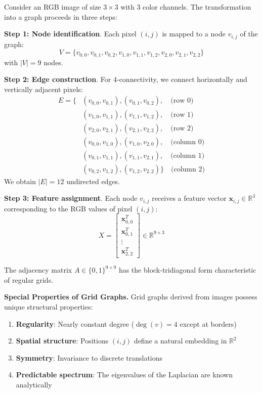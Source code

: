 \begin{example}\label{ex:imagen_3x3_grafo}
Consider an RGB image of size $3 \times 3$ with 3 color channels. The transformation into a graph proceeds in three steps:

\textbf{Step 1: Node identification}. Each pixel $(i,j)$ is mapped to a node $v_{i,j}$ of the graph:
\[
V = \{v_{0,0}, v_{0,1}, v_{0,2}, v_{1,0}, v_{1,1}, v_{1,2}, v_{2,0}, v_{2,1}, v_{2,2}\}
\]
with $|V| = 9$ nodes.

\textbf{Step 2: Edge construction}. For 4-connectivity, we connect horizontally and vertically adjacent pixels:
\begin{align}
E = \{&(v_{0,0}, v_{0,1}), (v_{0,1}, v_{0,2}), \quad \text{(row 0)} \\
    &(v_{1,0}, v_{1,1}), (v_{1,1}, v_{1,2}), \quad \text{(row 1)} \\
    &(v_{2,0}, v_{2,1}), (v_{2,1}, v_{2,2}), \quad \text{(row 2)} \\
    &(v_{0,0}, v_{1,0}), (v_{1,0}, v_{2,0}), \quad \text{(column 0)} \\
    &(v_{0,1}, v_{1,1}), (v_{1,1}, v_{2,1}), \quad \text{(column 1)} \\
    &(v_{0,2}, v_{1,2}), (v_{1,2}, v_{2,2}) \} \quad \text{(column 2)}
\end{align}
We obtain $|E| = 12$ undirected edges.

\textbf{Step 3: Feature assignment}. Each node $v_{i,j}$ receives a feature vector $\mathbf{x}_{i,j} \in \mathbb{R}^3$ corresponding to the RGB values of pixel $(i,j)$:
\[
X = \begin{bmatrix} \mathbf{x}_{0,0}^T \\ \mathbf{x}_{0,1}^T \\ \vdots \\ \mathbf{x}_{2,2}^T \end{bmatrix} \in \mathbb{R}^{9 \times 3}
\]

The adjacency matrix $A \in \{0,1\}^{9 \times 9}$ has the block-tridiagonal form characteristic of regular grids.
\end{example}

\textbf{Special Properties of Grid Graphs.} Grid graphs derived from images possess unique structural properties:
\begin{enumerate}
    \item \textbf{Regularity}: Nearly constant degree ($\deg(v) = 4$ except at borders)
    \item \textbf{Spatial structure}: Positions $(i,j)$ define a natural embedding in $\mathbb{R}^2$
    \item \textbf{Symmetry}: Invariance to discrete translations
    \item \textbf{Predictable spectrum}: The eigenvalues of the Laplacian are known analytically
\end{enumerate}

